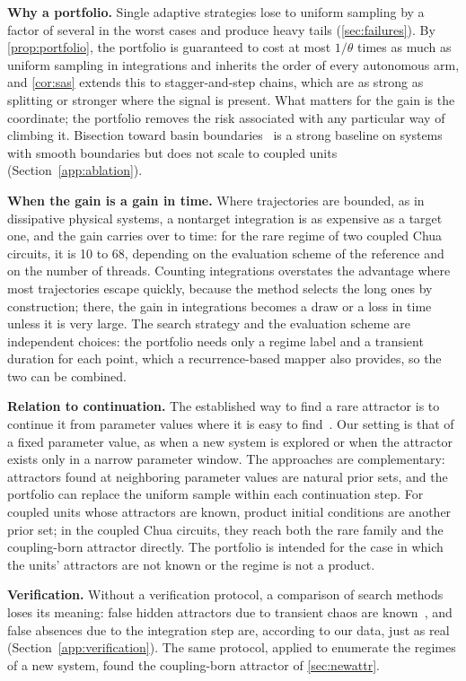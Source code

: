 \textbf{Why a portfolio.} Single adaptive strategies lose to uniform sampling by a factor of several in the worst cases and produce heavy tails (\cref{sec:failures}). By \cref{prop:portfolio}, the portfolio is guaranteed to cost at most $1/\theta$ times as much as uniform sampling in integrations and inherits the order of every autonomous arm, and \cref{cor:sas} extends this to stagger-and-step chains, which are as strong as splitting or stronger where the signal is present. What matters for the gain is the coordinate; the portfolio removes the risk associated with any particular way of climbing it. Bisection toward basin boundaries~\cite{NusseYorke1989,Skufca2006Edge} is a strong baseline on systems with smooth boundaries but does not scale to coupled units (Section~\ref{app:ablation}).

\textbf{When the gain is a gain in time.} Where trajectories are bounded, as in dissipative physical systems, a nontarget integration is as expensive as a target one, and the gain carries over to time: for the rare regime of two coupled Chua circuits, it is 10 to 68, depending on the evaluation scheme of the reference and on the number of threads. Counting integrations overstates the advantage where most trajectories escape quickly, because the method selects the long ones by construction; there, the gain in integrations becomes a draw or a loss in time unless it is very large. The search strategy and the evaluation scheme are independent choices: the portfolio needs only a regime label and a transient duration for each point, which a recurrence-based mapper also provides, so the two can be combined.

\textbf{Relation to continuation.} The established way to find a rare attractor is to continue it from parameter values where it is easy to find~\cite{Brzeski2017,Datseris2023Framework,Datseris2026Global}. Our setting is that of a fixed parameter value, as when a new system is explored or when the attractor exists only in a narrow parameter window. The approaches are complementary: attractors found at neighboring parameter values are natural prior sets, and the portfolio can replace the uniform sample within each continuation step. For coupled units whose attractors are known, product initial conditions are another prior set; in the coupled Chua circuits, they reach both the rare family and the coupling-born attractor directly. The portfolio is intended for the case in which the units' attractors are not known or the regime is not a product.

\textbf{Verification.} Without a verification protocol, a comparison of search methods loses its meaning: false hidden attractors due to transient chaos are known~\cite{SprottMunmuangsaen2018Comment,Danca2016Transient}, and false absences due to the integration step are, according to our data, just as real (Section~\ref{app:verification}). The same protocol, applied to enumerate the regimes of a new system, found the coupling-born attractor of \cref{sec:newattr}.

